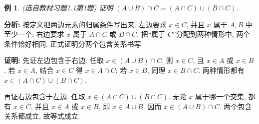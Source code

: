 \documentclass[UTF8,openany]{ctexbook}
\theoremstyle{chinesetextbook}
\newtheorem{example}{例}[section]
\newenvironment{cnproof}{\par\indent\textbf{证明:} \ignorespaces}{\par}
\begin{document}
\begin{example}
\textnormal{(选自教材习题1.1第1题)} 证明 $(A\cup B)\cap C=(A\cap C)\cup(B\cap C)$.
\end{example}
\par\indent\textbf{分析:} 按定义把两边元素的归属条件写出来. 左边要求 $x\in C$, 并且 $x$ 属于 $A,B$ 中至少一个; 右边要求 $x$ 属于 $A\cap C$ 或 $B\cap C$. 把“属于 $C$”分配到两种情形中, 两个条件恰好相同. 正式证明分两个包含关系书写.
\begin{cnproof}
先证左边包含于右边. 任取 $x\in(A\cup B)\cap C$, 则 $x\in C$, 且 $x\in A$ 或 $x\in B$. 若 $x\in A$, 结合 $x\in C$ 得 $x\in A\cap C$; 若 $x\in B$, 同理 $x\in B\cap C$. 两种情形都有 $x\in(A\cap C)\cup(B\cap C)$.

再证右边包含于左边. 任取 $x\in(A\cap C)\cup(B\cap C)$. 无论 $x$ 属于哪一个交集, 都有 $x\in C$, 并且 $x\in A$ 或 $x\in B$, 即 $x\in A\cup B$. 因而 $x\in(A\cup B)\cap C$. 两个包含关系都成立, 故等式成立.
\end{cnproof}
\end{document}
